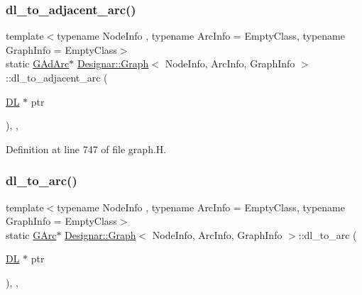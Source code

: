 \mbox{\label{class_designar_1_1_graph_afb508b7f8616948cc46c33deddcfaa4c}} 
\subsubsection{\texorpdfstring{dl\+\_\+to\+\_\+adjacent\+\_\+arc()}{dl\_to\_adjacent\_arc()}}
{\footnotesize\ttfamily template$<$typename Node\+Info , typename Arc\+Info  = Empty\+Class, typename Graph\+Info  = Empty\+Class$>$ \\
static \hyperlink{class_designar_1_1_graph_a7d00558995946c5653522148b54971bc}{G\+Ad\+Arc}$\ast$ \hyperlink{class_designar_1_1_graph}{Designar\+::\+Graph}$<$ Node\+Info, Arc\+Info, Graph\+Info $>$\+::dl\+\_\+to\+\_\+adjacent\+\_\+arc (\begin{DoxyParamCaption}\item[{\hyperlink{class_designar_1_1_d_l}{DL} $\ast$}]{ptr }\end{DoxyParamCaption})\hspace{0.3cm}{\ttfamily [inline]}, {\ttfamily [static]}, {\ttfamily [protected]}}



Definition at line 747 of file graph.\+H.

\mbox{\label{class_designar_1_1_graph_a543b3279c059a0ee596a56a704ab7825}} 
\subsubsection{\texorpdfstring{dl\+\_\+to\+\_\+arc()}{dl\_to\_arc()}}
{\footnotesize\ttfamily template$<$typename Node\+Info , typename Arc\+Info  = Empty\+Class, typename Graph\+Info  = Empty\+Class$>$ \\
static \hyperlink{class_designar_1_1_graph_a5ad9e18b71899c2d4979426e367e5573}{G\+Arc}$\ast$ \hyperlink{class_designar_1_1_graph}{Designar\+::\+Graph}$<$ Node\+Info, Arc\+Info, Graph\+Info $>$\+::dl\+\_\+to\+\_\+arc (\begin{DoxyParamCaption}\item[{\hyperlink{class_designar_1_1_d_l}{DL} $\ast$}]{ptr }\end{DoxyParamCaption})\hspace{0.3cm}{\ttfamily [inline]}, {\ttfamily [static]}, {\ttfamily [protected]}}



